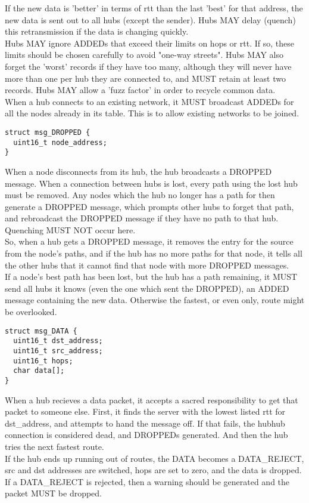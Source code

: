 \documentclass[a4paper,oneside,openany]{book}
\begin{document}
If the new data is 'better' in terms of rtt than the last 'best' for that address,
the new data is sent out to all hubs (except the sender). Hubs MAY delay (quench)
this retransmission if the data is changing quickly.\smallskip\\
Hubs MAY ignore ADDEDs that exceed their limits on hops or rtt. If so, these limits
should be chosen carefully to avoid "one-way streets". Hubs MAY also forget the
'worst' records if they have too many, although they will never have more than one
per hub they are connected to, and MUST retain at least two records. Hubs MAY allow
a 'fuzz factor' in order to recycle common data.\smallskip\\
When a hub connects to an existing network, it MUST broadcast ADDEDs for all the
nodes already in its table. This is to allow existing networks to be joined.
\begin{verbatim}
struct msg_DROPPED {
  uint16_t node_address;
}
\end{verbatim}
When a node disconnects from its hub, the hub broadcasts a DROPPED message.
When a connection between hubs is lost, every path using the lost hub must be
removed. Any nodes which the hub no longer has a path for then generate a
DROPPED message, which prompts other hubs to forget that path, and rebroadcast
the DROPPED message if they have no path to that hub. Quenching MUST NOT occur
here.\smallskip\\
So, when a hub gets a DROPPED message, it removes the entry for the source
from the node's paths, and if the hub has no more paths for that node, it tells
all the other hubs that it cannot find that node with more DROPPED messages.\smallskip\\
If a node's best path has been lost, but the hub has a path remaining, it MUST
send all hubs it knows (even the one which sent the DROPPED), an ADDED message
containing the new data. Otherwise the fastest, or even only, route might be
overlooked.
\begin{verbatim}
struct msg_DATA {
  uint16_t dst_address;
  uint16_t src_address;
  uint16_t hops;
  char data[];
}
\end{verbatim}
When a hub recieves a data packet, it accepts a sacred responsibility to get
that packet to someone else. First, it finds the server with the lowest listed
rtt for dst\_address, and attempts to hand the message off. If that fails, the
hub\rarrow{}hub connection is considered dead, and DROPPEDs generated. And then
the hub tries the next fastest route.\smallskip\\
If the hub ends up running out of routes, the DATA becomes a DATA\_REJECT, src
and dst addresses are switched, hops are set to zero, and the data is dropped.
If a DATA\_REJECT is rejected, then a warning should be generated and the
packet MUST be dropped.
\end{document}
